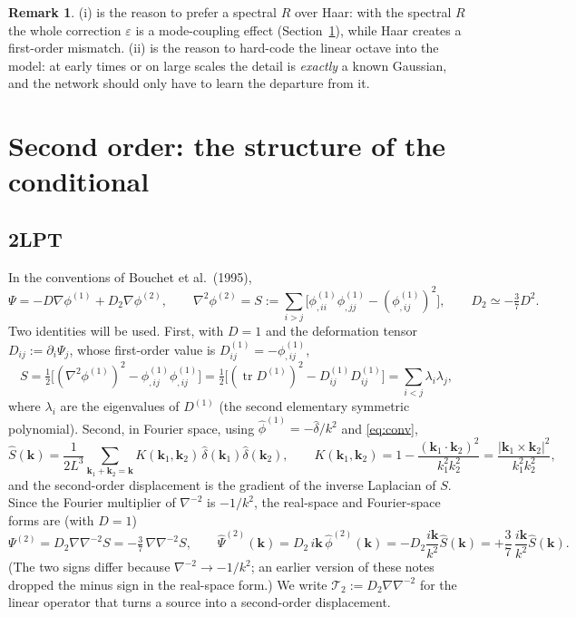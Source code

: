 \documentclass[11pt]{article}
\theoremstyle{definition}
\newtheorem{remark}[proposition]{Remark}
\newcommand{\kk}{\mathbf{k}}
\newcommand{\tr}{\operatorname{tr}}
\begin{document}
\begin{remark}
(i) is the reason to prefer a spectral $R$ over Haar: with the spectral $R$ the whole correction $\varepsilon$ is a mode-coupling effect (Section~\ref{sec:2lpt}), while Haar creates a first-order mismatch. (ii) is the reason to hard-code the linear octave into the model: at early times or on large scales the detail is \emph{exactly} a known Gaussian, and the network should only have to learn the departure from it.
\end{remark}

\section{Second order: the structure of the conditional}\label{sec:2lpt}

\subsection{2LPT}

In the conventions of Bouchet et al.\ (1995),
\begin{equation}
\Psi=-D\nabla\phi^{(1)}+D_2\nabla\phi^{(2)},\qquad \nabla^2\phi^{(2)}=S:=\sum_{i>j}\big[\phi^{(1)}_{,ii}\phi^{(1)}_{,jj}-(\phi^{(1)}_{,ij})^2\big],\qquad D_2\simeq-\tfrac37D^2 .
\label{eq:2lpt}
\end{equation}
Two identities will be used. First, with $D=1$ and the deformation tensor $D_{ij}:=\partial_i\Psi_j$, whose first-order value is $D^{(1)}_{ij}=-\phi^{(1)}_{,ij}$,
\begin{equation}
S=\tfrac12\Big[(\nabla^2\phi^{(1)})^2-\phi^{(1)}_{,ij}\phi^{(1)}_{,ij}\Big]=\tfrac12\Big[(\tr D^{(1)})^2-D^{(1)}_{ij}D^{(1)}_{ij}\Big]=\sum_{i<j}\lambda_i\lambda_j ,
\label{eq:S}
\end{equation}
where $\lambda_i$ are the eigenvalues of $D^{(1)}$ (the second elementary symmetric polynomial). Second, in Fourier space, using $\hat\phi^{(1)}=-\hat\delta/k^2$ and \eqref{eq:conv},
\begin{equation}
\hat S(\kk)=\frac{1}{2L^3}\sum_{\kk_1+\kk_2=\kk}K(\kk_1,\kk_2)\,\hat\delta(\kk_1)\hat\delta(\kk_2),\qquad
K(\kk_1,\kk_2)=1-\frac{(\kk_1\cdot\kk_2)^2}{k_1^2k_2^2}=\frac{|\kk_1\times\kk_2|^2}{k_1^2k_2^2},
\label{eq:kernel}
\end{equation}
and the second-order displacement is the gradient of the inverse Laplacian of $S$. Since the Fourier multiplier of $\nabla^{-2}$ is $-1/k^2$, the real-space and Fourier-space forms are (with $D=1$)
\begin{equation}
\Psi^{(2)}=D_2\nabla\nabla^{-2}S=-\tfrac37\,\nabla\nabla^{-2}S,\qquad
\hat\Psi^{(2)}(\kk)=D_2\,i\kk\,\hat\phi^{(2)}(\kk)=-D_2\frac{i\kk}{k^2}\hat S(\kk)=+\frac37\,\frac{i\kk}{k^2}\hat S(\kk).
\label{eq:psi2}
\end{equation}
(The two signs differ because $\nabla^{-2}\to-1/k^2$; an earlier version of these notes dropped the minus sign in the real-space form.) We write $\mathcal T_2:=D_2\nabla\nabla^{-2}$ for the linear operator that turns a source into a second-order displacement.
\end{document}
